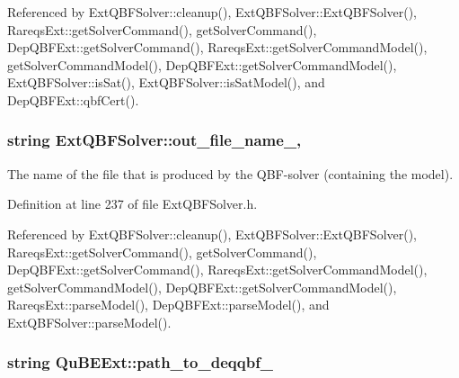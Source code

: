 Referenced by Ext\-Q\-B\-F\-Solver\-::cleanup(), Ext\-Q\-B\-F\-Solver\-::\-Ext\-Q\-B\-F\-Solver(), Rareqs\-Ext\-::get\-Solver\-Command(), get\-Solver\-Command(), Dep\-Q\-B\-F\-Ext\-::get\-Solver\-Command(), Rareqs\-Ext\-::get\-Solver\-Command\-Model(), get\-Solver\-Command\-Model(), Dep\-Q\-B\-F\-Ext\-::get\-Solver\-Command\-Model(), Ext\-Q\-B\-F\-Solver\-::is\-Sat(), Ext\-Q\-B\-F\-Solver\-::is\-Sat\-Model(), and Dep\-Q\-B\-F\-Ext\-::qbf\-Cert().

\hypertarget{classExtQBFSolver_a0efb35aa9b807dec521ad3406eaf664d}{
\subsubsection[{out\-\_\-file\-\_\-name\-\_\-}]{\setlength{\rightskip}{0pt plus 5cm}string Ext\-Q\-B\-F\-Solver\-::out\-\_\-file\-\_\-name\-\_\-\hspace{0.3cm}{\ttfamily [protected]}, {\ttfamily [inherited]}}}\label{classExtQBFSolver_a0efb35aa9b807dec521ad3406eaf664d}


The name of the file that is produced by the Q\-B\-F-\/solver (containing the model). 



Definition at line 237 of file Ext\-Q\-B\-F\-Solver.\-h.



Referenced by Ext\-Q\-B\-F\-Solver\-::cleanup(), Ext\-Q\-B\-F\-Solver\-::\-Ext\-Q\-B\-F\-Solver(), Rareqs\-Ext\-::get\-Solver\-Command(), get\-Solver\-Command(), Dep\-Q\-B\-F\-Ext\-::get\-Solver\-Command(), Rareqs\-Ext\-::get\-Solver\-Command\-Model(), get\-Solver\-Command\-Model(), Dep\-Q\-B\-F\-Ext\-::get\-Solver\-Command\-Model(), Rareqs\-Ext\-::parse\-Model(), Dep\-Q\-B\-F\-Ext\-::parse\-Model(), and Ext\-Q\-B\-F\-Solver\-::parse\-Model().

\hypertarget{classQuBEExt_aed89db58647a80a6204798720ec136df}{
\subsubsection[{path\-\_\-to\-\_\-deqqbf\-\_\-}]{\setlength{\rightskip}{0pt plus 5cm}string Qu\-B\-E\-Ext\-::path\-\_\-to\-\_\-deqqbf\-\_\-\hspace{0.3cm}{\ttfamily [protected]}}}\label{classQuBEExt_aed89db58647a80a6204798720ec136df}


